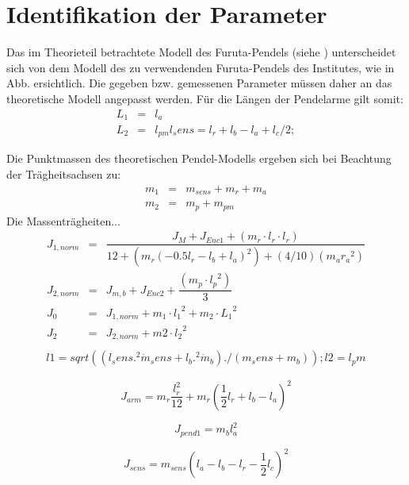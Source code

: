 \section{Identifikation der Parameter}
\label{sec.Parameter}
Das im Theorieteil betrachtete Modell des Furuta-Pendels (siehe \citep{Cazzolato.2011}) unterscheidet sich von dem Modell des zu verwendenden Furuta-Pendels des Institutes, wie in Abb. %
ersichtlich.
Die gegeben bzw. gemessenen Parameter müssen daher an das theoretische Modell angepasst werden. Für die Längen der Pendelarme gilt somit:
\begin{eqnarray}
L_1 &=& l_a \nonumber \\
L_2 &=& l_{pm}
l_sens=l_r+l_b-l_a+l_c/2;
\end{eqnarray}


Die Punktmassen des theoretischen Pendel-Modells ergeben sich bei Beachtung der Trägheitsachsen zu:
\begin{eqnarray}
m_1 &=& m_{sens}+m_r+m_a \nonumber \\
m_2 &=& m_p+m_{pm}
\end{eqnarray}
Die Massenträgheiten... %
\begin{eqnarray}
J_{1,norm}&=&\dfrac{J_M +J_{Enc1}+(m_r \cdot l_r \cdot l_r)}{12+(m_r (-0.5 l_r-l_b+l_a)^2)+(4/10) (m_a  {r_a}^{2})} \\
J_{2,norm}&=& J_{m,b}+J_{Enc2}   + \dfrac{(m_p \cdot {l_p}^{2})}{3} \\
J_0&=&J_{1,norm}+ m_1 \cdot {l_1}^{2} + m_2 \cdot {L_1}^{2} \\ 
J_2&=&J_{2,norm}+m2 \cdot {l_2}^2           \\
\end{eqnarray}
\begin{eqnarray}
l1=sqrt((l_sens.^2 \dot m_sens+l_b.^2 \dot m_b)./(m_sens+m_b));
l2=l_pm
\end{eqnarray}

\begin{equation}
J_{arm} = m_r \frac{l^2_r}{12}+m_r(\frac{1}{2}l_r+l_b-l_a)^2
\end{equation}

\begin{equation}
J_{pend1}=m_bl^2_a
\end{equation}

\begin{equation}
J_{sens}=m_{sens}(l_a-l_b-l_r-\frac{1}{2}l_c)^2
\end{equation}

